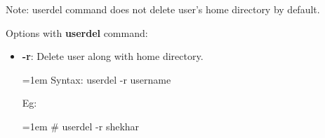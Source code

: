 \begin{flushleft}
	\begin{tcolorbox}[breakable,notitle,boxrule=-0pt,colback=yellow,colframe=yellow]
		\color{black}
		Note: userdel command does not delete user's home directory by default.
	\end{tcolorbox}	

	Options with \textbf{userdel} command:
	\begin{itemize}
		\item \textbf{-r}: Delete user along with home directory.
		\begin{tcolorbox}[breakable,notitle,boxrule=0pt,colback=pink,colframe=pink]
			\color{black}
			\font=1em
			Syntax: userdel -r username
			\font=4pt
		\end{tcolorbox}
		Eg:
		\begin{tcolorbox}[breakable,notitle,boxrule=-0pt,colback=black,colframe=black]
			\color{green}
			\font=1em
			\# userdel -r shekhar
			\font=4pt
		\end{tcolorbox}
	\end{itemize}
	
\end{flushleft}

\newpage


